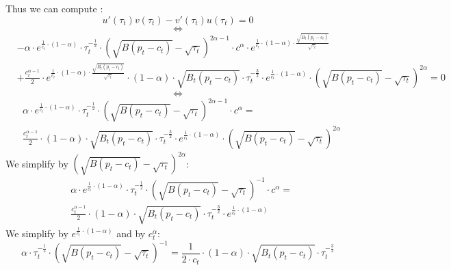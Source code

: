 \documentclass{article}
\begin{document}
Thus we can compute : 
\begin{equation*}
    u'(\tau_{t})v(\tau_{t})-v'(\tau_{t})u(\tau_{t})=0
\end{equation*}
$$\iff$$
\begin{equation*}
    \begin{split}
    & -\alpha\cdot e^{\frac{1}{c_{t}}\cdot\left(1-\alpha\right)}\cdot \tau_{t}^{-\frac{1}{2}}\cdot \left(\sqrt{B(p_{t}-c_{t})}-\sqrt{\tau_{t}}\right)^{2\alpha-1} \cdot  c^{\alpha}\cdot e^{\frac{1}{c_{t}}\cdot(1-\alpha)\cdot\frac{\sqrt{B_{t}(p_{t}-c_{t})}}{\sqrt{\tau_{t}}}} \\
    & +\frac{c_{t}^{\alpha-1}}{2}\cdot e^{\frac{1}{c_{t}}\cdot(1-\alpha)\cdot\frac{\sqrt{B_{t}(p_{t}-c_{t})}}{\sqrt{\tau_{t}}}}\cdot (1-\alpha)\cdot\sqrt{B_{t}(p_{t}-c_{t})}\cdot\tau_{t}^{-\frac{3}{2}}\cdot e^{\frac{1}{c_{t}}\cdot\left(1-\alpha\right)}\cdot\left(\sqrt{B(p_{t}-c_{t})}-\sqrt{\tau_{t}}\right)^{2\alpha}=0
    \end{split}
\end{equation*}
$$\iff$$
\begin{equation*}
    \begin{split}
    & \alpha\cdot e^{\frac{1}{c_{t}}\cdot\left(1-\alpha\right)}\cdot \tau_{t}^{-\frac{1}{2}}\cdot \left(\sqrt{B(p_{t}-c_{t})}-\sqrt{\tau_{t}}\right)^{2\alpha-1} \cdot  c^{\alpha} = \\
    & \frac{c_{t}^{\alpha-1}}{2}\cdot (1-\alpha)\cdot\sqrt{B_{t}(p_{t}-c_{t})}\cdot\tau_{t}^{-\frac{3}{2}}\cdot e^{\frac{1}{c_{t}}\cdot\left(1-\alpha\right)}\cdot\left(\sqrt{B(p_{t}-c_{t})}-\sqrt{\tau_{t}}\right)^{2\alpha}
    \end{split}
\end{equation*}
We simplify by $\left(\sqrt{B(p_{t}-c_{t})}-\sqrt{\tau_{t}}\right)^{2\alpha}$:
\begin{equation*}
    \begin{split}
    & \alpha\cdot e^{\frac{1}{c_{t}}\cdot\left(1-\alpha\right)}\cdot \tau_{t}^{-\frac{1}{2}}\cdot \left(\sqrt{B(p_{t}-c_{t})}-\sqrt{\tau_{t}}\right)^{-1} \cdot  c^{\alpha} = \\
    & \frac{c_{t}^{\alpha-1}}{2}\cdot (1-\alpha)\cdot\sqrt{B_{t}(p_{t}-c_{t})}\cdot\tau_{t}^{-\frac{3}{2}}\cdot e^{\frac{1}{c_{t}}\cdot\left(1-\alpha\right)}
    \end{split}
\end{equation*}
We simplify by $e^{\frac{1}{c_{t}}\cdot\left(1-\alpha\right)}$ and by $c_{t}^{\alpha}$:
\begin{equation*}
    \alpha\cdot \tau_{t}^{-\frac{1}{2}}\cdot \left(\sqrt{B(p_{t}-c_{t})}-\sqrt{\tau_{t}}\right)^{-1} = \frac{1}{2\cdot c_{t}}\cdot (1-\alpha)\cdot\sqrt{B_{t}(p_{t}-c_{t})}\cdot\tau_{t}^{-\frac{3}{2}} 
\end{equation*}
\end{document}
